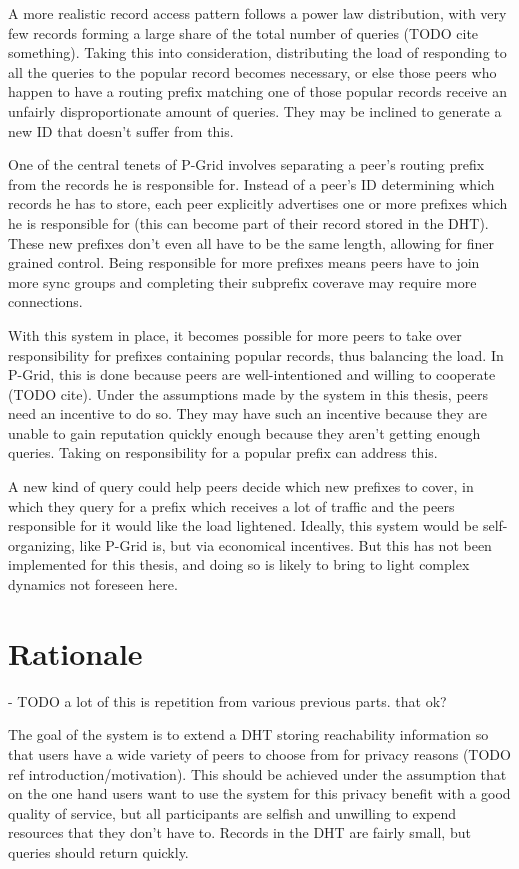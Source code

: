 A more realistic record access pattern follows a power law distribution, with
very few records forming a large share of the total number of queries (TODO cite
something). Taking this into consideration, distributing the load of responding
to all the queries to the popular record becomes necessary, or else those peers
who happen to have a routing prefix matching one of those popular records
receive an unfairly disproportionate amount of queries. They may be inclined to
generate a new ID that doesn't suffer from this.

One of the central tenets of P-Grid involves separating a peer's routing prefix
from the records he is responsible for. Instead of a peer's ID determining which
records he has to store, each peer explicitly advertises one or more prefixes
which he is responsible for (this can become part of their record stored in the
\ac{DHT}). These new prefixes don't even all have to be the same length,
allowing for finer grained control. Being responsible for more prefixes means
peers have to join more sync groups and completing their subprefix coverave may
require more connections.

With this system in place, it becomes possible for more peers to take over
responsibility for prefixes containing popular records, thus balancing the load.
In P-Grid, this is done because peers are well-intentioned and willing to
cooperate (TODO cite). Under the assumptions made by the system in this thesis,
peers need an incentive to do so. They may have such an incentive because they
are unable to gain reputation quickly enough because they aren't getting enough
queries.  Taking on responsibility for a popular prefix can address this.

A new kind of query could help peers decide which new prefixes to cover, in
which they query for a prefix which receives a lot of traffic and the peers
responsible for it would like the load lightened. Ideally, this system would be
self-organizing, like P-Grid is, but via economical incentives. But this has not
been implemented for this thesis, and doing so is likely to bring to light
complex dynamics not foreseen here.

\section{Rationale}
\label{sec:desc_rationale}
- TODO a lot of this is repetition from various previous parts. that ok?

The goal of the system is to extend a \ac{DHT} storing reachability information
so that users have a wide variety of peers to choose from for privacy reasons
(TODO ref introduction/motivation). This should be achieved under the assumption
that on the one hand users want to use the system for this privacy benefit with
a good quality of service, but all participants are selfish and unwilling to
expend resources that they don't have to. Records in the \ac{DHT} are fairly
small, but queries should return quickly.

